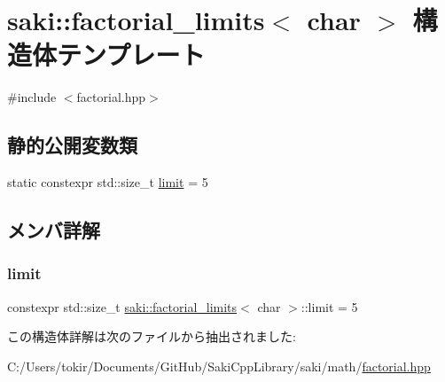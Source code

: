 \hypertarget{structsaki_1_1factorial__limits_3_01char_01_4}{}\section{saki\+:\+:factorial\+\_\+limits$<$ char $>$ 構造体テンプレート}
\label{structsaki_1_1factorial__limits_3_01char_01_4}


{\ttfamily \#include $<$factorial.\+hpp$>$}

\subsection*{静的公開変数類}
\begin{DoxyCompactItemize}
\item 
static constexpr std\+::size\+\_\+t \mbox{\hyperlink{structsaki_1_1factorial__limits_3_01char_01_4_a5b3764a279c893de69dc28fbf8097ce9}{limit}} = 5
\end{DoxyCompactItemize}


\subsection{メンバ詳解}
\mbox{\label{structsaki_1_1factorial__limits_3_01char_01_4_a5b3764a279c893de69dc28fbf8097ce9}} 
\subsubsection{\texorpdfstring{limit}{limit}}
{\footnotesize\ttfamily constexpr std\+::size\+\_\+t \mbox{\hyperlink{structsaki_1_1factorial__limits}{saki\+::factorial\+\_\+limits}}$<$ char $>$\+::limit = 5\hspace{0.3cm}{\ttfamily [static]}}



この構造体詳解は次のファイルから抽出されました\+:\begin{DoxyCompactItemize}
\item 
C\+:/\+Users/tokir/\+Documents/\+Git\+Hub/\+Saki\+Cpp\+Library/saki/math/\mbox{\hyperlink{factorial_8hpp}{factorial.\+hpp}}\end{DoxyCompactItemize}
